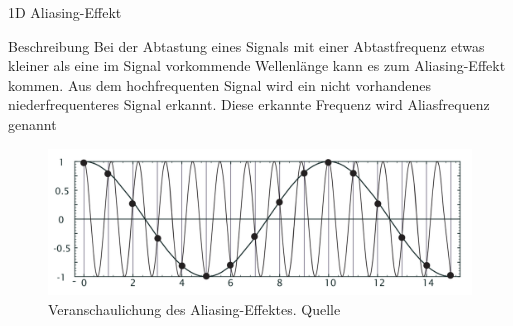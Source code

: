 \documentclass{beamer}
\begin{document}
	\begin{frame}{1D Aliasing-Effekt}
	\begin{block}{Beschreibung}
		\small Bei der Abtastung eines Signals mit einer Abtastfrequenz etwas kleiner als eine im Signal vorkommende Wellenlänge kann es zum Aliasing-Effekt kommen. Aus dem hochfrequenten Signal wird ein nicht vorhandenes niederfrequenteres Signal erkannt. Diese erkannte Frequenz wird Aliasfrequenz genannt 
	\end{block}
	
	\begin{figure}
		\includegraphics[width=\textheight]{antialiasing.pdf}
		\caption{\footnotesize Veranschaulichung des Aliasing-Effektes. Quelle\cite{bildverarbeitung}}
	\end{figure}
	
	\end{frame}
\end{document}
